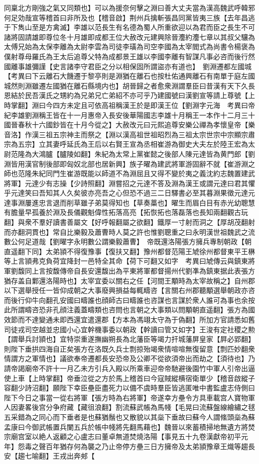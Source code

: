 同稟北方剛強之氣又同類也】可以為援奈何擊之淵曰善大丈夫當為漢高魏武呼韓邪何足効哉宣等稽首曰非所及也【稽音啟】荆州兵擒斬張昌同黨皆夷三族【去年昌逃于下雋山至是方禽滅】李雄以范長生有名德為蜀人所重欲迎以為君而臣之長生不可諸將固請雄即尊位冬十月雄即成都王位大赦改元建興除晉灋約灋七章以其叔父驤為太傅兄始為太保李離為太尉李雲為司徒李璜為司空李國為太宰閻式為尚書令楊褒為僕射尊母羅氏為王太后追尊父特為成都景王雄以李國李離有智謀凡事必咨而後行然國離事雄彌謹【史言諸李守君臣之分以相保固所謂盜亦有道也】　劉淵遷都左國城　【考異曰下云離石大饑遷于黎亭則是淵猶在離石也按杜佑通興離石有南單于庭左國城然則淵雖遷左國猶在離石縣境内也】胡晉歸之者愈衆淵謂羣臣曰昔漢有天下久長恩結於民吾漢氏之甥約為兄弟兄亡弟紹不亦可乎乃建國號曰漢劉宣等請上尊號【上時掌翻】淵曰今四方未定且可依高祖稱漢王於是即漢王位【劉淵字元海　考異曰帝紀李雄劉淵稱王皆在十一月惠帝入長安後華陽國志李雄十月稱王一本作十二月三十國晉春秋十六國鈔皆在十月今從之】大赦改元曰元熙追尊安樂公禪為孝懷皇帝【樂音洛】作漢三祖五宗神主而祭之【淵以漢高祖世祖昭烈為三祖太宗世宗中宗顯宗肅宗為五宗】立其妻呼延氏為王后以右賢王宣為丞相崔游為御史大夫左於陸王宏為太尉范隆為大鴻臚【臚陵如翻】朱紀為太常上黨崔懿之後部人陳元達皆為黄門郎【劉淵皆用漢官制後部即匈奴北部也居新興】族子曜為建武將軍游固辭不就【崔游淵之師也范隆朱紀同門生崔游既能以師道不為淵屈且又得不變於夷之義沈約志魏置建武將軍】元達少有志操【少詩照翻】淵嘗招之元達不答及淵為漢王或謂元達曰君其懼乎元達笑曰吾知其人久矣彼亦亮吾之心但恐不過三二日驛書必至其暮淵果徵元達元達事淵屢進忠言退而削草雖子弟莫得知也【草奏藁也】曜生而眉白目有赤光幼聰慧有膽量早孤養於淵及長儀觀魁偉性拓落高亮【拓恢拓也落磊落也長知兩翻觀古玩翻】與衆不羣好讀書善屬文【好呼報翻屬之欲翻】鐵厚一寸射而洞之【厚胡茂翻射而亦翻洞貫也】常自比樂毅及蕭曹時人莫之許也惟劉聰重之曰永明漢世祖魏武之流數公何足道哉【劉曜字永明數公謂樂毅蕭曹】　帝既還洛陽張方擁兵專制朝政【朝直遥翻下同】太弟頴不得復豫事【復扶又翻】豫州都督范陽王虓徐州都督東平王楙等上言頴弗克負荷宜降封一邑特全其命【荷下可翻又如字　考異曰虓傳云與鎮東將軍劉馥同上言按馥傳帝自長安還馥出為平東將軍都督揚州代劉凖為鎮東据此表張方猶存盖自鄴還洛陽時也】太宰宜委以關右之任【河間王顒時為太宰故稱之】自州郡以下選舉授任一皆仰成朝之大事廢興損益每輒疇咨【言關右州郡聽顒選舉朝政亦咨而後行仰牛向翻孔安國曰疇誰也顔師古曰疇誰也咨謀也言謀於衆人誰可為事也余按此所謂疇咨恐非孔顔注義蓋疇類也咨問也言朝之大事類以問顒朝直遥翻】張方為國效節而不達變通未即西還宜遣還郡【方本為馮翊太守為于偽翻】所加方官請悉如舊司徒戎司空越並忠國小心宜幹機事委以朝政【幹讀曰管又如字】王浚有定社稷之勲【謂舉兵討頴也】宜特崇重遂撫幽朔長為北藩臣等竭力扞城藩屏皇家【屛必郢翻】則陛下垂拱四海自正矣張方在洛既久兵士剽掠殆竭衆情喧喧無復留意【剽匹妙翻衆情謂方之軍情也】議欲奉帝遷都長安恐帝及公卿不從欲須帝出而劫之【須待也】乃請帝謁廟帝不許十一月乙未方引兵入殿以所乘車迎帝帝馳避後園竹中軍人引帝出逼使上車【上時掌翻】帝垂泣從之方於馬上稽首曰今寇賊縱横宿衛單少【稽音啟縱子容翻少詩沼翻】願陛下幸臣壘臣盡死力以備不虞時羣臣皆逃匿唯中書監盧志侍側曰陛下今日之事當一從右將軍【張方時為右將軍】帝遂幸方壘令方具車載宫人寶物軍人因妻畧後宫分争府藏【藏徂浪翻】割流蘇武帳為馬帴【毛晃曰流蘇盤線繪繡之毬五采錯為之同心而下垂者是也蘇猶鬚也又散貌以其橤下垂故曰蘇今人謂絛頭橤為蘇孟康曰今御武帳置兵闌五兵於帳中帴將先翻馬藉也】魏晉以來蓄積掃地無遺方將焚宗廟宫室以絶人返顧之心盧志曰董卓無道焚燒洛陽【事見五十九卷漢獻帝初平元年】怨毒之聲百年猶存何為襲之乃止帝停方壘三日方擁帝及太弟頴豫章王熾等趨長安【趨七喻翻】王戎出奔郟【